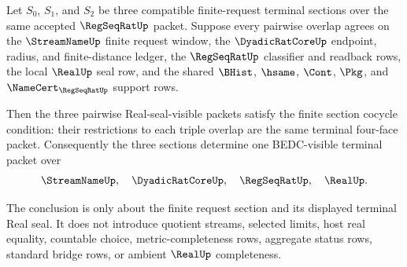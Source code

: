 \begin{theorem}
\label{thm:regseqrat-finite-request-section-cocycle-real-seal}
Let $S_0$, $S_1$, and $S_2$ be three compatible finite-request terminal
sections over the same accepted $\RegSeqRatUp$ packet. Suppose every pairwise
overlap agrees on the $\StreamNameUp$ finite request window, the
$\DyadicRatCoreUp$ endpoint, radius, and finite-distance ledger, the
$\RegSeqRatUp$ classifier and readback rows, the local $\RealUp$ seal row,
and the shared $\BHist$, $\hsame$, $\Cont$, $\Pkg$, and
$\NameCert_{\RegSeqRatUp}$ support rows.

Then the three pairwise Real-seal-visible packets satisfy the finite
section cocycle condition: their restrictions to each triple overlap are the
same terminal four-face packet. Consequently the three sections determine
one BEDC-visible terminal packet over
$$
\StreamNameUp,\quad \DyadicRatCoreUp,\quad \RegSeqRatUp,\quad \RealUp.
$$

The conclusion is only about the finite request section and its displayed
terminal Real seal. It does not introduce quotient streams, selected limits,
host real equality, countable choice, metric-completeness rows, aggregate
status rows, standard bridge rows, or ambient $\RealUp$ completeness.
\end{theorem}
